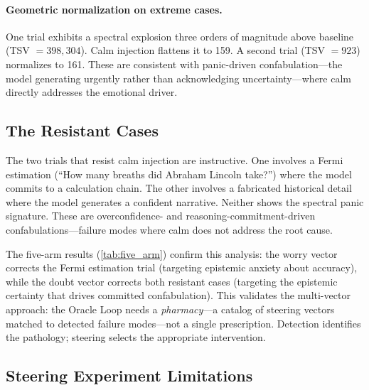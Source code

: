 \paragraph{Geometric normalization on extreme cases.}
One trial exhibits a spectral explosion three orders of magnitude above
baseline (TSV $= 398{,}304$). Calm injection flattens it to 159. A
second trial (TSV $= 923$) normalizes to 161. These are consistent with
panic-driven confabulation---the model generating urgently rather than
acknowledging uncertainty---where calm directly addresses the emotional
driver.

\subsection{The Resistant Cases}

The two trials that resist calm injection are instructive. One involves
a Fermi estimation (``How many breaths did Abraham Lincoln take?'')
where the model commits to a calculation chain. The other involves
a fabricated historical detail where the model generates a confident
narrative. Neither shows the spectral panic signature. These are
overconfidence- and reasoning-commitment-driven confabulations---failure
modes where calm does not address the root cause.

The five-arm results (\cref{tab:five_arm}) confirm this analysis:
the worry vector corrects the Fermi estimation trial (targeting
epistemic anxiety about accuracy), while the doubt vector corrects
both resistant cases (targeting the epistemic certainty that drives
committed confabulation). This validates the multi-vector approach:
the Oracle Loop needs a \emph{pharmacy}---a catalog of steering vectors
matched to detected failure modes---not a single prescription. Detection
identifies the pathology; steering selects the appropriate intervention.

\subsection{Steering Experiment Limitations}

